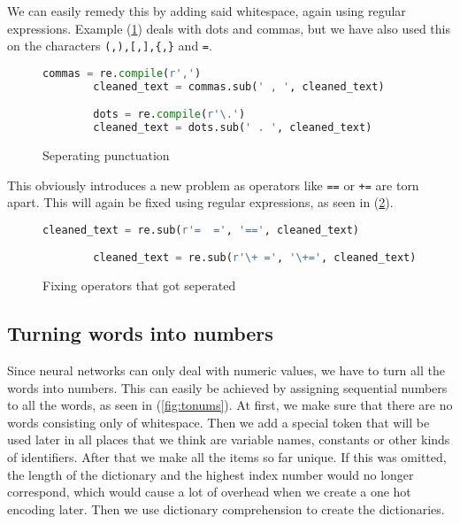     We can easily remedy this by adding said whitespace, again using
    regular expressions.  Example (\ref{fig:puncts}) deals with
    dots and commas, but we have also used this on the characters
    \verb+(,),[,],{,}+ and \verb+=+.

    \begin{figure}[htpb]
      \centering \begin{lstlisting}[language=Python]
        commas = re.compile(r',')
        cleaned_text = commas.sub(' , ', cleaned_text)

        dots = re.compile(r'\.') 
        cleaned_text = dots.sub(' . ', cleaned_text) \end{lstlisting} 
        \caption{Seperating punctuation} 
        \label{fig:puncts}
    \end{figure}

    This obviously introduces a new problem as operators like \verb+==+
    or \verb|+=| are torn apart. This will again be fixed using regular expressions,
    as seen in (\ref{fig:operators}).

    \begin{figure}[htpb]
      \centering
      \begin{lstlisting}[language=Python]
        cleaned_text = re.sub(r'=  =', '==', cleaned_text)

        cleaned_text = re.sub(r'\+ =', '\+=', cleaned_text) \end{lstlisting}
      \caption{Fixing operators that got seperated}
      \label{fig:operators}
    \end{figure}

  \subsection{Turning words into numbers}
  \label{sub:turning_words_into_numbers}
  
    Since neural networks can only deal with numeric values, we have to turn all the words into numbers.
    This can easily be achieved by assigning sequential numbers to all the words, as seen in (\ref{fig:tonums}).
    At first, we make sure that there are no words consisting only of whitespace. Then we add a special token
    that will be used later in all places that we think are variable names, constants or other kinds
    of identifiers. After that we make all the items so far unique. If this was omitted, the length of the dictionary
    and the highest index number would no longer correspond, which would cause a lot of overhead when we
    create a one hot encoding later. Then we use dictionary comprehension to create the dictionaries.

